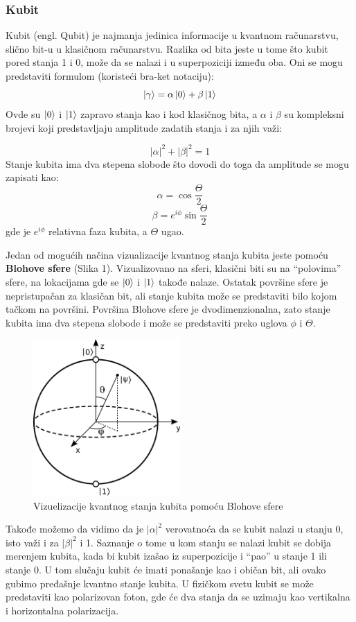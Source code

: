 \documentclass[12pt, letterpaper, oneside]{article}
\begin{document}
\subsubsection*{Kubit}
Kubit (engl. Qubit) je najmanja jedinica informacije u kvantnom računarstvu, slično bit-u u klasičnom računarstvu.
Razlika od bita jeste u tome što kubit pored stanja 1 i 0, može da se nalazi i u superpoziciji između oba.
Oni se mogu predstaviti formulom (koristeći bra-ket notaciju):
\[ \ket{\gamma} =  \alpha\ket{0}+\beta\ket{1} \]
Ovde su $\ket{0}$ i $\ket{1}$ zapravo stanja kao i kod klasičnog bita, a $\alpha$ i $\beta$ su kompleksni brojevi koji predstavljaju amplitude zadatih stanja i za njih važi:

\[ |\alpha|^2+|\beta|^2 = 1 \]
Stanje kubita ima dva stepena slobode što dovodi do toga da amplitude se mogu zapisati kao:
\[
    \alpha = \cos{\frac{\Theta}{2}} 
\]
\[
    \beta = e^{i\phi}\sin{\frac{\Theta}{2}}
\]
gde je $e^{i\phi}$ relativna faza kubita, a $\Theta$ ugao.

Jedan od mogućih načina vizualizacije kvantnog stanja kubita jeste pomoću \textbf{Blohove sfere} (Slika 1).
Vizualizovano na sferi, klasični biti su na ``polovima'' sfere, na lokacijama gde se $\Ket{0}$ i $\Ket{1}$  takođe nalaze.
Ostatak površine sfere je nepristupačan za klasičan bit, ali stanje kubita može se predstaviti bilo kojom tačkom na površini.
Površina Blohove sfere je dvodimenzionalna, zato stanje kubita ima dva stepena slobode i može se predstaviti preko uglova $\phi$ i $\Theta$.
\begin{figure}[ht]
    \centering
    \includegraphics[width=0.5\textwidth]{files/Bloch_sphere.png}
    \caption{Vizuelizacije kvantnog stanja kubita pomoću Blohove sfere \cite{BlochSphereImage}}
\end{figure}

Takođe možemo da vidimo da je $|\alpha|^2$ verovatnoća da se kubit nalazi u stanju 0, isto važi i za $ |\beta|^2$ i 1.
Saznanje o tome u kom stanju se nalazi kubit se dobija merenjem kubita, kada bi kubit izašao iz superpozicije i ``pao'' u stanje 1 ili stanje 0. U tom slučaju kubit će imati ponašanje kao i običan bit, ali ovako gubimo pređašnje kvantno stanje kubita.
U fizičkom svetu kubit se može predstaviti kao polarizovan foton, gde će dva stanja da se uzimaju kao vertikalna i horizontalna polarizacija.
\end{document}
